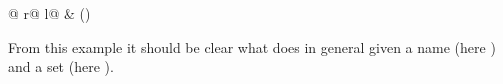 \begin{isabellebody}
\begin{isamarkuptext}
\begin{center}
\begin{tabular}{@ {}r@ {\qquad\qquad}l@ {}}
 & ()
\end{tabular}
\end{center}
%
From this example it should be clear what  does
in general given a name (here ) and a set
(here ).


\end{isamarkuptext}
\end{isabellebody}
